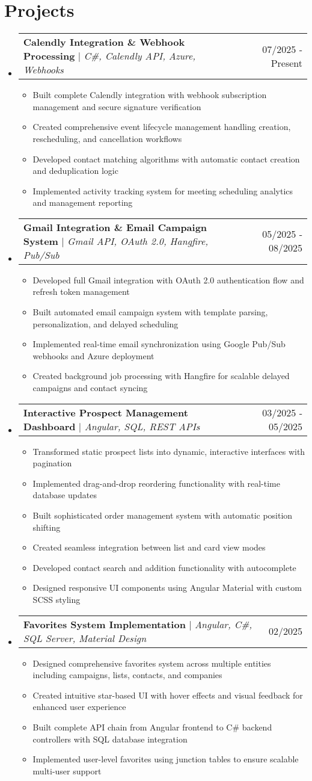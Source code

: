 \documentclass[letterpaper,11pt]{article}
\makeatletter
\newcommand{\resumeItem}[1]{
  \item\small{
    {#1 \vspace{-2pt}}
  }
}
\newcommand{\resumeProjectHeading}[2]{
    \item
    \begin{tabular*}{0.97\textwidth}{l@{\extracolsep{\fill}}r}
      \small#1 & #2 \\
    \end{tabular*}\vspace{-7pt}
}
\newcommand{\resumeSubHeadingListStart}{\begin{itemize}[leftmargin=0.15in, label={}]}
\newcommand{\resumeSubHeadingListEnd}{\end{itemize}}
\newcommand{\resumeItemListStart}{\begin{itemize}}
\newcommand{\resumeItemListEnd}{\end{itemize}\vspace{-5pt}}
\makeatother
\begin{document}
\section{Projects}
    \resumeSubHeadingListStart
      \resumeProjectHeading
          {\textbf{Calendly Integration \& Webhook Processing} $|$ \emph{C\#, Calendly API, Azure, Webhooks}}{07/2025 - Present}
          \resumeItemListStart
            \resumeItem{Built complete Calendly integration with webhook subscription management and secure signature verification}
            \resumeItem{Created comprehensive event lifecycle management handling creation, rescheduling, and cancellation workflows}
            \resumeItem{Developed contact matching algorithms with automatic contact creation and deduplication logic}
            \resumeItem{Implemented activity tracking system for meeting scheduling analytics and management reporting}
          \resumeItemListEnd
      \resumeProjectHeading
          {\textbf{Gmail Integration \& Email Campaign System} $|$ \emph{Gmail API, OAuth 2.0, Hangfire, Pub/Sub}}{05/2025 - 08/2025}
          \resumeItemListStart
            \resumeItem{Developed full Gmail integration with OAuth 2.0 authentication flow and refresh token management}
            \resumeItem{Built automated email campaign system with template parsing, personalization, and delayed scheduling}
            \resumeItem{Implemented real-time email synchronization using Google Pub/Sub webhooks and Azure deployment}
            \resumeItem{Created background job processing with Hangfire for scalable delayed campaigns and contact syncing}
          \resumeItemListEnd
      \resumeProjectHeading
          {\textbf{Interactive Prospect Management Dashboard} $|$ \emph{Angular, SQL, REST APIs}}{03/2025 - 05/2025}
          \resumeItemListStart
            \resumeItem{Transformed static prospect lists into dynamic, interactive interfaces with pagination}
            \resumeItem{Implemented drag-and-drop reordering functionality with real-time database updates}
            \resumeItem{Built sophisticated order management system with automatic position shifting}
            \resumeItem{Created seamless integration between list and card view modes}
            \resumeItem{Developed contact search and addition functionality with autocomplete}
            \resumeItem{Designed responsive UI components using Angular Material with custom SCSS styling}
          \resumeItemListEnd
      \resumeProjectHeading
          {\textbf{Favorites System Implementation} $|$ \emph{Angular, C\#, SQL Server, Material Design}}{02/2025}
          \resumeItemListStart
            \resumeItem{Designed comprehensive favorites system across multiple entities including campaigns, lists, contacts, and companies}
            \resumeItem{Created intuitive star-based UI with hover effects and visual feedback for enhanced user experience}
            \resumeItem{Built complete API chain from Angular frontend to C\# backend controllers with SQL database integration}
            \resumeItem{Implemented user-level favorites using junction tables to ensure scalable multi-user support}
          \resumeItemListEnd
    \resumeSubHeadingListEnd

\end{document}
